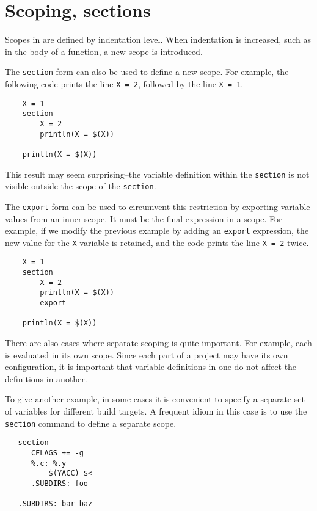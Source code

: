 \section{Scoping, sections}
\label{section:section}

Scopes in  are defined by indentation level.  When indentation is
increased, such as in the body of a function, a new scope is introduced.

The \verb+section+ form can also be used to define a new scope.  For example, the following code
prints the line \verb+X = 2+, followed by the line \verb+X = 1+.

\begin{verbatim}
    X = 1
    section
        X = 2
        println(X = $(X))

    println(X = $(X))
\end{verbatim}

This result may seem surprising--the variable definition within the
\verb+section+ is not visible outside the scope of the \verb+section+.

The \verb+export+ form can be used to circumvent this restriction by
exporting variable values from an inner scope.  It must be the final
expression in a scope.  For example, if we modify the previous example
by adding an \verb+export+ expression, the new value for the \verb+X+
variable is retained, and the code prints the line \verb+X = 2+ twice.

\begin{verbatim}
    X = 1
    section
        X = 2
        println(X = $(X))
        export

    println(X = $(X))
\end{verbatim}

There are also cases where separate scoping is quite important.  For example,
each  is evaluated in its own scope.  Since each part of a project
may have its own configuration, it is important that variable definitions in one
 do not affect the definitions in another.

To give another example, in some cases it is convenient to specify a
separate set of variables for different build targets.  A frequent
idiom in this case is to use the \verb+section+ command to define a
separate scope.

\begin{verbatim}
   section
      CFLAGS += -g
      %.c: %.y
          $(YACC) $<
      .SUBDIRS: foo

   .SUBDIRS: bar baz
\end{verbatim}

